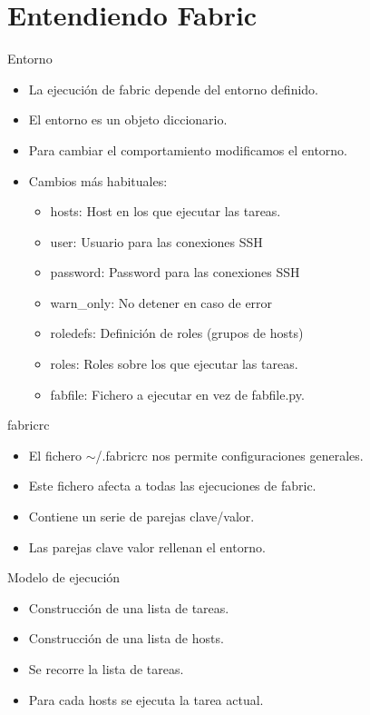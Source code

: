 \documentclass[10pt]{beamer}
\begin{document}
  \section*{Entendiendo Fabric}
  \begin{frame}{Entorno}
    \begin{itemize}
      \item La ejecución de fabric depende del entorno definido.
      \item El entorno es un objeto diccionario.
      \item Para cambiar el comportamiento modificamos el entorno.
      \item Cambios más habituales:
      \begin{itemize}
        \item hosts: Host en los que ejecutar las tareas.
        \item user: Usuario para las conexiones SSH
        \item password: Password para las conexiones SSH
        \item warn\_only: No detener en caso de error
        \item roledefs: Definición de roles (grupos de hosts)
        \item roles: Roles sobre los que ejecutar las tareas.
        \item fabfile: Fichero a ejecutar en vez de fabfile.py.
      \end{itemize}
    \end{itemize}
  \end{frame}

  \begin{frame}{fabricrc}
    \begin{itemize}
      \item El fichero $\sim$/.fabricrc nos permite configuraciones generales.
      \item Este fichero afecta a todas las ejecuciones de fabric.
      \item Contiene un serie de parejas clave/valor.
      \item Las parejas clave valor rellenan el entorno.
    \end{itemize}
  \end{frame}

  \begin{frame}{Modelo de ejecución}
    \begin{itemize}
      \item Construcción de una lista de tareas.
      \item Construcción de una lista de hosts.
      \item Se recorre la lista de tareas.
      \item Para cada hosts se ejecuta la tarea actual.
    \end{itemize}
  \end{frame}
\end{document}

